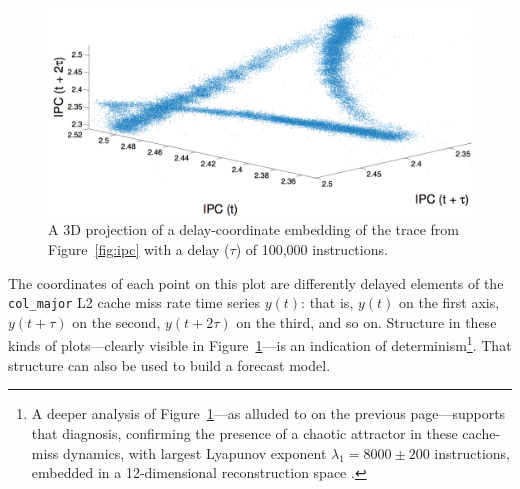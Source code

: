 \documentclass{article}
\begin{document}
 \begin{figure}
   \centering
     \includegraphics[width=\textwidth]{figs/colipc3d.png}
     \caption{A 3D projection of a delay-coordinate embedding of the trace
 from Figure~\ref{fig:ipc} with a delay ($\tau$) of 100,000 instructions.
 }
 \label{fig:embedding}
 \end{figure}


The coordinates of each point on this plot are differently delayed
elements of the \verb|col_major| L2 cache miss rate time series
$y(t)$: that is, $y(t)$ on the first axis, $y(t+\tau)$ on the second,
$y(t+2\tau)$ on the third, and so on.
Structure in these kinds of plots---clearly visible in
Figure~\ref{fig:embedding}---is an indication of
determinism\footnote{A deeper analysis of
  Figure~\ref{fig:embedding}---as alluded to on the previous
  page---supports that diagnosis, confirming the presence of a chaotic
  attractor in these cache-miss dynamics, with largest Lyapunov
  exponent $\lambda_1 = 8000 \pm 200$ instructions, embedded in a
  12-dimensional reconstruction space \cite{mytkowicz09}.}.  That
structure can also be used to build a forecast model.

\end{document}
